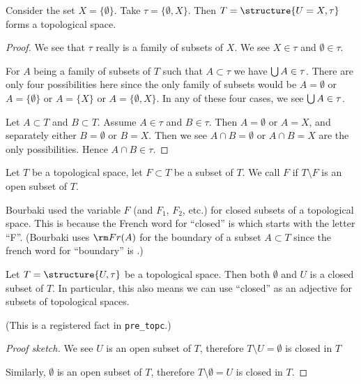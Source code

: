 \begin{example}
Consider the set $X=\{\emptyset\}$. Take $\tau=\{\emptyset,X\}$.
Then $T=\structure{U=X,\tau}$ forms a topological space.

\begin{proof}
We see that $\tau$ really is a family of subsets of $X$.
We see $X\in\tau$ and $\emptyset\in\tau$.

For $A$ being a family of subsets of $T$ such that $A\subset\tau$ we
have $\bigcup A\in\tau$. There are only four possibilities here since
the only family of subsets would be $A=\emptyset$ or $A=\{\emptyset\}$
or $A=\{X\}$ or $A=\{\emptyset,X\}$. In any of these four cases, we
see $\bigcup A\in\tau$.

Let $A\subset T$ and $B\subset T$. Assume $A\in\tau$ and $B\in\tau$. 
Then $A=\emptyset$ or $A=X$, and separately either $B=\emptyset$ or $B=X$.
Then we see $A\cap B=\emptyset$ or $A\cap B=X$ are the only possibilities. 
Hence $A\cap B\in\tau$.
\end{proof}
\end{example}

\begin{definition}
Let $T$ be a topological space, let $F\subset T$ be a subset of $T$.
We call $F$  if $T\setminus F$ is an open subset of $T$.
\end{definition}

\begin{remark}
Bourbaki used the variable $F$ (and $F_{1}$, $F_{2}$, etc.) for closed
subsets of a topological space. This is because the French word for
``closed'' is  which starts with the letter ``F''.
(Bourbaki uses $\mathop{\rm Fr}(A)$ for the boundary of a subset
$A\subset T$ since the french word for ``boundary'' is
.) 
\end{remark}

\begin{example}
Let $T = \structure{U,\tau}$ be a topological space.
Then both $\emptyset$ and $U$ is a closed subset of $T$.
In particular, this also means we can use ``closed'' as an adjective
for subsets of topological spaces.

(This is a registered fact in \texttt{pre\_topc}.)

\begin{proof}[Proof sketch]
We see $U$ is an open subset of $T$, therefore $T\setminus U=\emptyset$
is closed in $T$

Similarly, $\emptyset$ is an open subset of $T$, therefore
$T\setminus\emptyset=U$ is closed in $T$.
\end{proof}
\end{example}

